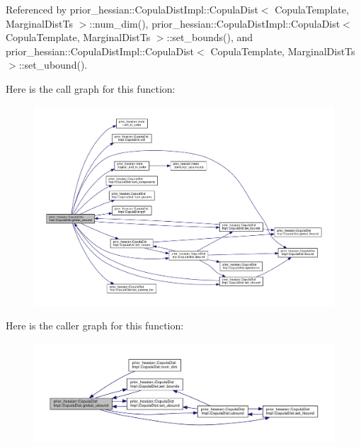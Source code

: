 Referenced by prior\+\_\+hessian\+::\+Copula\+Dist\+Impl\+::\+Copula\+Dist$<$ Copula\+Template, Marginal\+Dist\+Ts $>$\+::num\+\_\+dim(), prior\+\_\+hessian\+::\+Copula\+Dist\+Impl\+::\+Copula\+Dist$<$ Copula\+Template, Marginal\+Dist\+Ts $>$\+::set\+\_\+bounds(), and prior\+\_\+hessian\+::\+Copula\+Dist\+Impl\+::\+Copula\+Dist$<$ Copula\+Template, Marginal\+Dist\+Ts $>$\+::set\+\_\+ubound().



Here is the call graph for this function\+:\nopagebreak
\begin{figure}[H]
\begin{center}
\leavevmode
\includegraphics[width=350pt]{classprior__hessian_1_1CopulaDistImpl_1_1CopulaDist_aad110f1a85e7611fd098aa51c2104015_cgraph}
\end{center}
\end{figure}




Here is the caller graph for this function\+:\nopagebreak
\begin{figure}[H]
\begin{center}
\leavevmode
\includegraphics[width=350pt]{classprior__hessian_1_1CopulaDistImpl_1_1CopulaDist_aad110f1a85e7611fd098aa51c2104015_icgraph}
\end{center}
\end{figure}


